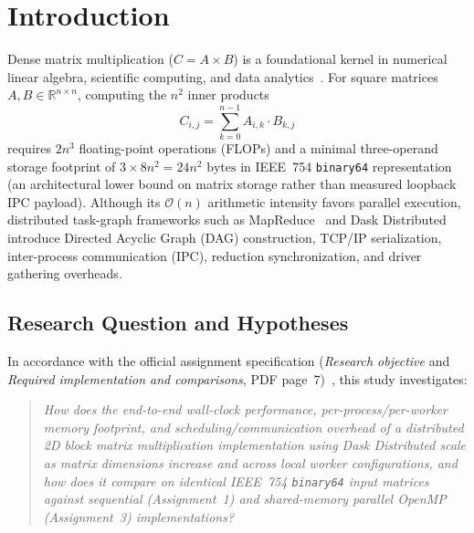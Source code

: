 \documentclass[11pt,a4paper]{article}
\begin{document}
\begin{abstract}
\SIrange{84.60}{113.62}{\mebi\byte} per-worker OS RSS, \SIrange{5.72}{33.38}{\mebi\byte} managed memory, \SI{0}{\byte} spill, $\le \SI{0.335}{\second}$ worker compute, and 96.11\% of $T_{\text{E2E}}$ in \texttt{scatter\_s}+\texttt{wait\_s}+\texttt{gather\_s} at $p=8$ (98.70\% with \texttt{graph\_submission\_s}). All distributed experiments ran on one physical machine via Dask Distributed worker processes over localhost (\texttt{127.0.0.1}); no multi-machine deployment was used.
\end{abstract}

\section{Introduction}
Dense matrix multiplication ($C = A \times B$) is a foundational kernel in numerical linear algebra, scientific computing, and data analytics~\cite{Golub2013}. For square matrices $A, B \in \mathbb{R}^{n \times n}$, computing the $n^2$ inner products
\begin{equation}
C_{i, j} = \sum_{k=0}^{n-1} A_{i, k} \cdot B_{k, j}
\end{equation}
requires $2n^3$ floating-point operations (FLOPs) and a minimal three-operand storage footprint of $3 \times 8n^2 = 24n^2\text{ bytes}$ in IEEE~754 \texttt{binary64} representation~\cite{IEEE754} (an architectural lower bound on matrix storage rather than measured loopback IPC payload). Although its $\mathcal{O}(n)$ arithmetic intensity favors parallel execution, distributed task-graph frameworks such as MapReduce~\cite{Dean2008} and Dask Distributed~\cite{Rocklin2015} introduce Directed Acyclic Graph (DAG) construction, TCP/IP serialization, inter-process communication (IPC), reduction synchronization, and driver gathering overheads.

\subsection{Research Question and Hypotheses}
In accordance with the official assignment specification (\emph{Research objective} and \emph{Required implementation and comparisons}, PDF page~7)~\cite{CourseSpec}, this study investigates:
\begin{quote}
\textit{How does the end-to-end wall-clock performance, per-process/per-worker memory footprint, and scheduling/communication overhead of a distributed 2D block matrix multiplication implementation using Dask Distributed scale as matrix dimensions increase and across local worker configurations, and how does it compare on identical IEEE~754 \texttt{binary64} input matrices against sequential (Assignment~1) and shared-memory parallel OpenMP (Assignment~3) implementations?}
\end{quote}
\end{document}
